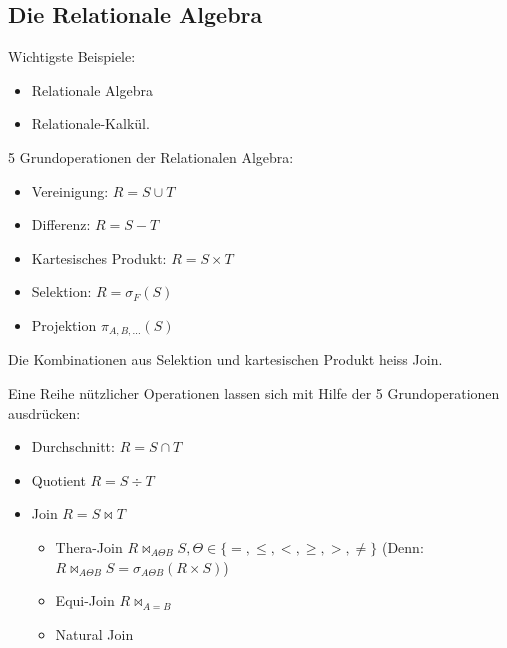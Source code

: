 \subsection{Die Relationale Algebra}
Wichtigste Beispiele:
\begin{itemize}
    \item Relationale Algebra
    \item Relationale-Kalk\"ul.
\end{itemize}

5 Grundoperationen der Relationalen Algebra:
\begin{itemize}
    \item Vereinigung: $R = S \cup T$
    \item Differenz: \(R = S - T\)
    \item Kartesisches Produkt: \(R = S \times T\)
    \item Selektion: \(R = \sigma_F(S)\)
    \item Projektion \(\pi_{A,B,...}(S)\)
\end{itemize}
\begin{remark}
    Die Kombinationen aus Selektion und kartesischen Produkt heiss Join.
\end{remark}
Eine Reihe n\"utzlicher Operationen lassen sich mit Hilfe der 5 Grundoperationen ausdr\"ucken:
\begin{itemize}
    \item Durchschnitt: $R=S\cap T$
    \item Quotient    $R = S \div T$
    \item Join    $R = S \bowtie T$
    \begin{itemize}
        \item Thera-Join $R \bowtie_{A\Theta B} S, \Theta\in \{=,\leq ,<,\geq, >,\not = \}$ (Denn: $R \bowtie_{A\Theta B} S = \sigma_{A\Theta B}(R\times S)$)
        \item Equi-Join $R \bowtie_{A= B}$
        \item Natural Join
    \end{itemize}
\end{itemize}